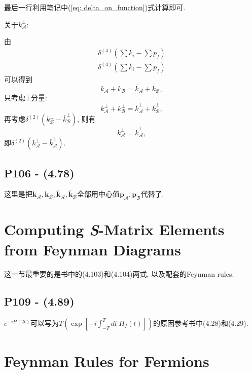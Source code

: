 \documentclass[10pt,b5paper,openany]{book}
\begin{document}
最后一行利用笔记中(\ref{eq: delta_on_function})式计算即可. 

关于$k_{\mathcal{A}}^{\bot}$: 

由
\begin{gather}
  \delta^{(4)}(\sum k_i - \sum p_f) \\
  \delta^{(4)}(\sum \bar{k}_i - \sum p_f)
\end{gather}
可以得到
\begin{equation}
  k_\mathcal{A} + k_\mathcal{B} = \bar{k}_\mathcal{A} + \bar{k}_\mathcal{B}, 
\end{equation}
只考虑$\bot$分量: 
\begin{equation}
  k_{\mathcal{A}}^{\bot} + k_{\mathcal{B}}^{\bot} = \bar{k}_{\mathcal{A}}^{\bot} + \bar{k}_{\mathcal{B}}^{\bot}, 
\end{equation}
再考虑$\delta^{(2)}(k_{\mathcal{B}}^{\bot} - \bar{k}_{\mathcal{B}}^{\bot})$, 则有
\begin{equation}
  k_{\mathcal{A}}^{\bot} = \bar{k}_{\mathcal{A}}^{\bot}, 
\end{equation}
即$\delta^{(2)}(k_{\mathcal{A}}^{\bot} - \bar{k}_{\mathcal{A}}^{\bot})$.

\subsection{P106 - (4.78)}

这里是把$\mathbf{k}_{\mathcal{A}}, \mathbf{k}_{\mathcal{B}}, \bar{\mathbf{k}}_{\mathcal{A}}, \bar{\mathbf{k}}_{\mathcal{B}}$全部用中心值$\mathbf{p}_{\mathcal{A}}, \mathbf{p}_{\mathcal{B}}$代替了. 

\section{Computing \textit{S}-Matrix Elements from Feynman Diagrams}

这一节最重要的是书中的(4.103)和(4.104)两式, 以及配套的Feynman rules. 

\subsection{P109 - (4.89)}

$e^{-iH(2t)}$可以写为$T(\exp[-i\int_{-T}^{T}dt\ H_I(t)])$的原因参考书中(4.28)和(4.29).

\section{Feynman Rules for Fermions}
\end{document}
